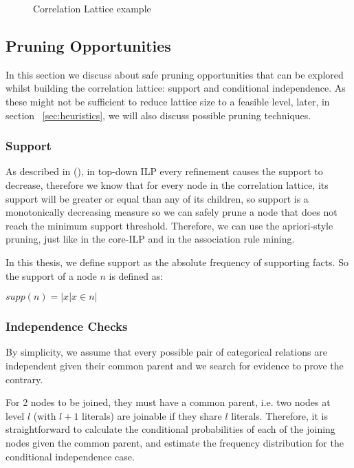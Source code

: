 \begin{figure}[!h]
  \caption{Correlation Lattice example}
  \centering
  \begin{tikzpicture}
  [scale=1.8,auto=center,every node/.style={draw=black, font=\tiny}]
  
  \end{tikzpicture}
  \label{fig:lattice}
\end{figure}

\subsection{Pruning Opportunities}

In this section we discuss about safe pruning opportunities that can be explored whilst building the correlation
lattice: support and conditional independence. As these might not be sufficient to reduce lattice size to a feasible
level, later, in section ~\ref{sec:heuristics}, we will also discuss possible pruning techniques.

\subsubsection{Support}

As described in (\cite{LavracDz94}), in top-down ILP every refinement causes the support to decrease, therefore we
know
that for every node in the correlation lattice, its support will be greater or equal than any of its children, so
support is a monotonically decreasing measure so we can safely prune a node that does not reach the minimum support
threshold. Therefore, we can use the apriori-style pruning, just like in the core-ILP and in the association rule
mining.

In this thesis, we define support as the absolute frequency of supporting facts. So the support of a node $n$ is
defined as:

$supp(n)=|{x|x \in n}|$


\subsubsection{Independence Checks}

By simplicity, we assume that every possible pair of categorical relations are independent given their common parent
and
we search for evidence to prove the contrary.

For 2 nodes to be joined, they must have a common parent, i.e. two nodes at level $l$ (with $l+1$ literals) are
joinable
if they share $l$ literals. Therefore, it is straightforward to calculate the conditional probabilities of each of the
joining nodes given the common parent, and estimate the frequency distribution for the conditional independence case.

